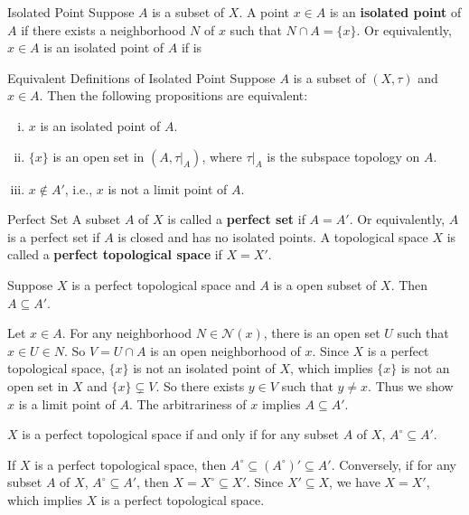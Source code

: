\documentclass{report}
\begin{document}
\begin{definition}{Isolated Point}{}
	Suppose $A$ is a subset of $X$. A point $x\in A$ is an \textbf{isolated point} of $A$ if there exists a neighborhood $N$ of $x$ such that $N\cap A=\{x\}$. Or equivalently, $x\in A$ is an isolated point of $A$ if is
\end{definition}
\begin{proposition}{Equivalent Definitions of Isolated Point}{}
	Suppose $A$ is a subset of $(X,\tau)$ and $x\in A$. Then the following propositions are equivalent:
	\begin{enumerate}[(i)]
		\item $x$ is an isolated point of $A$.
		\item $\{x\}$ is an open set in $(A,\tau|_A)$, where $\tau|_A$ is the subspace topology on $A$.
		\item $x\notin A'$, i.e., $x$ is not a limit point of $A$.
	\end{enumerate}
\end{proposition}

\begin{definition}
	{Perfect Set}{}
	A subset $A$ of $X$ is called a \textbf{perfect set} if $A=A'$. Or equivalently, $A$ is a perfect set if $A$ is closed and has no isolated points. A topological space $X$ is called a \textbf{perfect topological space} if $X=X'$.
\end{definition}

\begin{proposition}{}{}
	Suppose $X$ is a perfect topological space and $A$ is a open subset of $X$. Then $A\subseteq A'$.
\end{proposition}

\begin{prf}
	Let $x\in A$. For any neighborhood $N\in\mathcal{N}(x)$, there is an open set $U$ such that $x\in U \in N$. So $V=U\cap A$ is an open neighborhood of $x$. Since $X$ is a perfect topological space, $\{x\}$ is not an isolated point of $X$, which implies $\{x\}$ is not an open set in $X$ and $\{x\}\subsetneq V$. So there exists $y\in V$ such that $y\ne x$. Thus we show $x$ is a limit point of $A$. The arbitrariness of $x$ implies $A\subseteq A'$.
\end{prf}

\begin{corollary}{}{}
	$X$ is a perfect topological space if and only if for any subset $A$ of $X$, $A^\circ\subseteq A'$.
\end{corollary}
\begin{prf}
	If $X$ is a perfect topological space, then $A^\circ\subseteq (A^\circ)'\subseteq A'$. Conversely, if for any subset $A$ of $X$, $A^\circ\subseteq A'$, then $X=X^\circ\subseteq X'$. Since $X'\subseteq X$, we have $X=X'$, which implies $X$ is a perfect topological space.
\end{prf}
\end{document}
